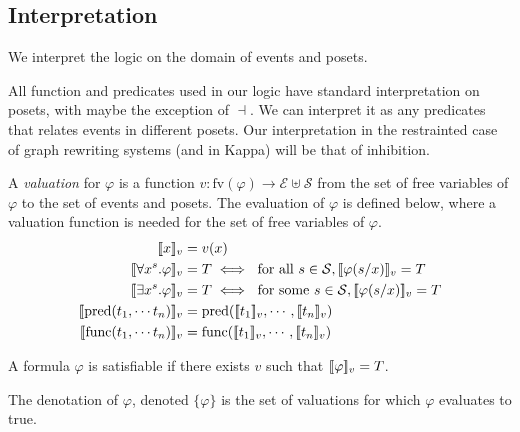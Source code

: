 \subsection{Interpretation}

We interpret the logic on the domain of events and posets.

All function and predicates used in our logic have standard interpretation on posets, with maybe the exception of $\dashv$. We can interpret it as any predicates that relates events in different posets. Our interpretation in the restrainted case of graph rewriting systems (and in Kappa) will be that of inhibition.

A \emph{valuation} for $\varphi$ is a function
$v:\text{fv}(\varphi)\to\mathcal{E}\uplus\mathcal{S}$
from the set of free variables of $\varphi$ to the set of events and posets.
%
The evaluation of $\varphi$ is defined below, where a valuation function is needed for the set of free variables of $\varphi$.
\begin{align*}
  \enc{x}_{v} &= v(x)\\
  \enc{\forall x^s.\varphi}_{v} &= T \iff\text{ for all }s\in\mathcal{S}, \enc{\varphi(s/x)}_{v} = T\\
  \enc{\exists x^s.\varphi}_{v} &= T \iff\text{ for some }s\in\mathcal{S}, \enc{\varphi(s/x)}_{v} = T\\
  \enc{\text{pred}(t_1,\cdots t_n)}_{v} &= \text{pred}(\enc{t_1}_{v},\cdots,\enc{t_n}_{v}) \\
  \enc{\text{func}(t_1,\cdots t_n)}_{v} &= \text{func}(\enc{t_1}_{v},\cdots,\enc{t_n}_{v}) \\
\end{align*}

A formula $\varphi$ is satisfiable if there exists $v$ such that $[\![\varphi]\!]_v = T$.

The denotation of $\varphi$, denoted $\{\varphi\}$ is the set of valuations for which $\varphi$ evaluates to true.
